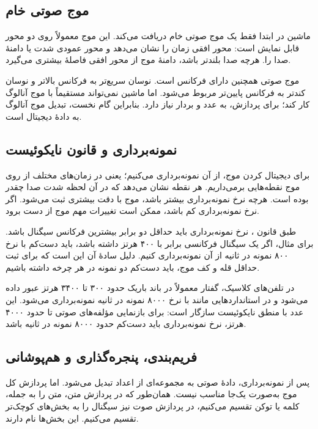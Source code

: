 \subsection{موج صوتی خام}
ماشین در ابتدا فقط یک موج صوتی خام دریافت می‌کند. این موج معمولاً روی دو محور قابل نمایش است: محور افقی زمان را نشان می‌دهد و محور عمودی شدت یا دامنهٔ صدا را. هرچه صدا بلندتر باشد، دامنهٔ موج از محور افقی فاصلهٔ بیشتری می‌گیرد.

موج صوتی همچنین دارای فرکانس است. نوسان سریع‌تر به فرکانس بالاتر و نوسان کندتر به فرکانس پایین‌تر مربوط می‌شود. اما ماشین نمی‌تواند مستقیماً با موج آنالوگ کار کند؛ برای پردازش، به عدد و بردار نیاز دارد. بنابراین گام نخست، تبدیل موج آنالوگ به دادهٔ دیجیتال است.

\subsection{نمونه‌برداری و قانون نایکوئیست}
برای دیجیتال کردن موج، از آن نمونه‌برداری می‌کنیم؛ یعنی در زمان‌های مختلف از روی موج نقطه‌هایی برمی‌داریم. هر نقطه نشان می‌دهد که در آن لحظه شدت صدا چقدر بوده است. هرچه نرخ نمونه‌برداری بیشتر باشد، موج با دقت بیشتری ثبت می‌شود. اگر نرخ نمونه‌برداری کم باشد، ممکن است تغییرات مهم موج از دست برود.

طبق قانون ، نرخ نمونه‌برداری باید حداقل دو برابر بیشترین فرکانس سیگنال باشد. برای مثال، اگر یک سیگنال فرکانسی برابر با ۴۰۰ هرتز داشته باشد، باید دست‌کم با نرخ ۸۰۰ نمونه در ثانیه از آن نمونه‌برداری کنیم. دلیل سادهٔ آن این است که برای ثبت حداقل قله و کف موج، باید دست‌کم دو نمونه در هر چرخه داشته باشیم.

در تلفن‌های کلاسیک، گفتار معمولاً در باند باریک حدود ۳۰۰ تا ۳۴۰۰ هرتز عبور داده می‌شود و در استانداردهایی مانند  با نرخ ۸۰۰۰ نمونه در ثانیه نمونه‌برداری می‌شود. این عدد با منطق نایکوئیست سازگار است: برای بازنمایی مؤلفه‌های صوتی تا حدود ۴۰۰۰ هرتز، نرخ نمونه‌برداری باید دست‌کم حدود ۸۰۰۰ نمونه در ثانیه باشد.


\subsection{فریم‌بندی، پنجره‌گذاری و هم‌پوشانی}
پس از نمونه‌برداری، دادهٔ صوتی به مجموعه‌ای از اعداد تبدیل می‌شود. اما پردازش کل موج به‌صورت یک‌جا مناسب نیست. همان‌طور که در پردازش متن، متن را به جمله، کلمه یا توکن تقسیم می‌کنیم، در پردازش صوت نیز سیگنال را به بخش‌های کوچک‌تر تقسیم می‌کنیم. این بخش‌ها  نام دارند.

